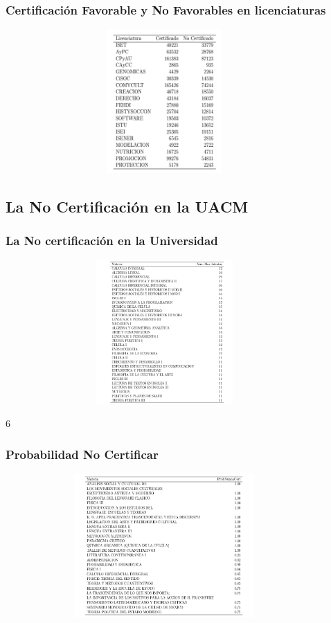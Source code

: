 \documentclass[xcolor=dvipsnames]{beamer}
\begin{document}
\begin{frame}\frametitle{Certificaci\'on Favorable y No Favorables en licenciaturas}
\begin{figure}[H]
\centering
\includegraphics[width=10cm,height=5.5cm]{Tablas/CertificacionLicFnF.png}
\end{figure}
\end{frame}

\subsection{La No Certificaci\'on en la UACM}

\begin{frame}\frametitle{La No certificaci\'on en la Universidad}
\begin{figure}[H]
\centering
\includegraphics[width=10cm,height=5.5cm]{Tablas/MateriaMaxIntNoCert.png}
\end{figure}6
\end{frame}

\begin{frame}\frametitle{Probabilidad No Certificar}
\begin{figure}[H]
\centering
\includegraphics[width=10cm,height=5.5cm]{Tablas/MateriasNoCert.png}
\end{figure}
\end{frame}
\end{document}

